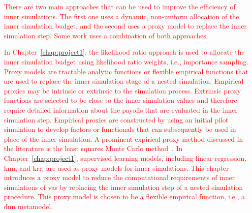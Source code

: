 \textcolor{red}{There are two main approaches that can be used to improve the efficiency of inner simulations.
The first one uses a dynamic, non-uniform allocation of the inner simulation budget, and the second uses a proxy model to replace the inner simulation step.
Some work uses a combination of both approaches.}

\textcolor{red}{In Chapter~\ref{chap:project1}, the likelihood ratio approach is used to allocate the inner simulation budget using likelihood ratio weights, i.e., importance sampling.
Proxy models are tractable analytic functions or flexible empirical functions that are used to replace the inner simulation stage of a nested simulation.
Empirical proxies may be intrinsic or extrinsic to the simulation process. Extrinsic proxy functions are selected to be close to the inner simulation values and therefore require detailed information about the payoffs that are evaluated in the inner simulation step. 
Empirical proxies are constructed by using an initial pilot simulation to develop factors or functionals that can subsequently be used in place of the inner simulation. 
A prominent expirical proxy method discussed in the literature is the least squares Monte Carlo method~\citep{longstaff2001valuing}.
In Chapter~\ref{chap:project1}, supervised learning models, including linear regression, \gls{knn}, and \gls{krr}, are used as proxy models for inner simulations.
This chapter introduces a proxy model to reduce the computational requirements of inner simulations of \gls{va}s by replacing the inner simulation step of a nested simulation procedure. 
This proxy model is chosen to be a flexible empirical function, i.e., a \gls{dnn} metamodel.}

